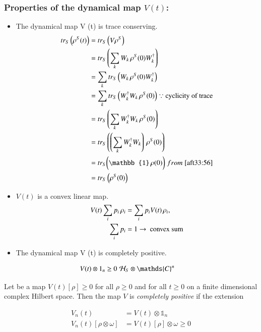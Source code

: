 \subsubsection{Properties of the dynamical map $V (t)$:}
\begin{itemize}
\item The dynamical map V (t) is trace conserving.
\begin{align}\label{aft33:57}
tr_{S}\left(\rho^{S}(t)\right) 
&=tr_{S}\left(V\rho^{S}\right)\notag \\
&=tr_{S}\left(\sum_{k}W_{k}\thinspace\rho^{S}(0)W_{k}^{\dagger} \right)\notag \\
&=\sum_{k} tr_{S}\left(W_{k}\thinspace\rho^{S}(0)W_{k}^{\dagger} \right)\notag \\
&=\sum_{k} tr_{S} \left(W_{k}^{\dagger} W_{k}\thinspace\rho^{S}(0)\right)\notag  \because \textnormal{cyclicity of trace}\\
&=tr_{S} \left(\sum_{k} W_{k}^{\dagger} W_{k}\thinspace\rho^{S}(0)\right)\notag \\
&=tr_{S} \left( \left(\sum_{k} W_{k}^{\dagger} W_{k} \right)\thinspace\rho^{S}(0)\right)\notag \\
&=tr_{S} \bigg( \mathbb{1} \thinspace \rho(0) \bigg)\thickspace  from \thickspace \eqref{aft33:56}\notag \\
&=tr_{S}\left(\rho^{S}(0)\right)
\end{align}

\item $V (t)$ is a convex linear map.
\begin{align}\label{aft33:58}
V(t)\sum_{i}p_{i}\thinspace\rho_{i} &=\sum_{i}p_{i}V(t)\thinspace\rho_{i}, \\
\sum_{i}p_{i}&=1 \rightarrow \textnormal{ convex sum}
\end{align}
\item The dynamical map V (t) is completely positive.
\end{itemize}
\begin{align}\label{aft33:59}
V(t)\otimes { 1 }_{ n }\ge 0 \thinspace &\textnormal \thinspace {\mathcal{H}  }_{ S }\otimes \mathds{C}^{n}
\end{align}

Let be a map $V(t)[\rho] \geq 0$ for all $\rho \geq 0$ and for all $t \geq 0$ on a finite dimensional complex 
Hilbert space. Then the map $V$ is {\it completely positive} if the extension

\begin{align}\label{aft33:60}
V_{n}(t) &=V(t)\otimes \mathbb{1}_{n}\\ 
V_{n}(t)\left[\rho\otimes\omega\right] &=V(t)\left[\rho\right]\otimes\omega\geq{0}
\end{align}


